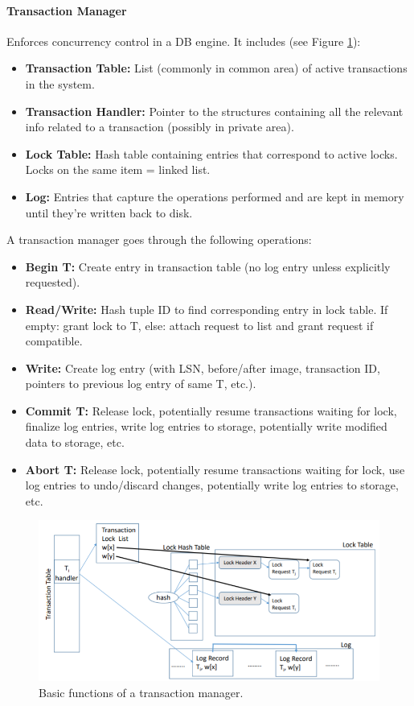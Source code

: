 \paragraph{Transaction Manager}
Enforces concurrency control in a DB engine. It includes (see Figure \ref{fig:manager}):
\begin{itemize}
    \item \textbf{Transaction Table:} List (commonly in common area) of active transactions in the system.
    \item \textbf{Transaction Handler:} Pointer to the structures containing all the relevant info related to a transaction (possibly in private area).
    \item \textbf{Lock Table:} Hash table containing entries that correspond to active locks. Locks on the same item = linked list.
    \item \textbf{Log:} Entries that capture the operations performed and are kept in memory until they're written back to disk.
\end{itemize}
A transaction manager goes through the following operations:
\begin{itemize}
    \item \textbf{Begin T:} Create entry in transaction table (no log entry unless explicitly requested).
    \item \textbf{Read/Write:} Hash tuple ID to find corresponding entry in lock table. If empty: grant lock to T, else: attach request to list and grant request if compatible.
    \item \textbf{Write:} Create log entry (with LSN, before/after image, transaction ID, pointers to previous log entry of same T, etc.).
    \item \textbf{Commit T:} Release lock, potentially resume transactions waiting for lock, finalize log entries, write log entries to storage, potentially write modified data to storage, etc.
    \item \textbf{Abort T:} Release lock, potentially resume transactions waiting for lock, use log entries to undo/discard changes, potentially write log entries to storage, etc.
\end{itemize}

\begin{figure}[h]
	\centering
	\includegraphics[scale=0.7]{images/4-manager.PNG}
	\caption{Basic functions of a transaction manager.}
	\label{fig:manager}
\end{figure}


